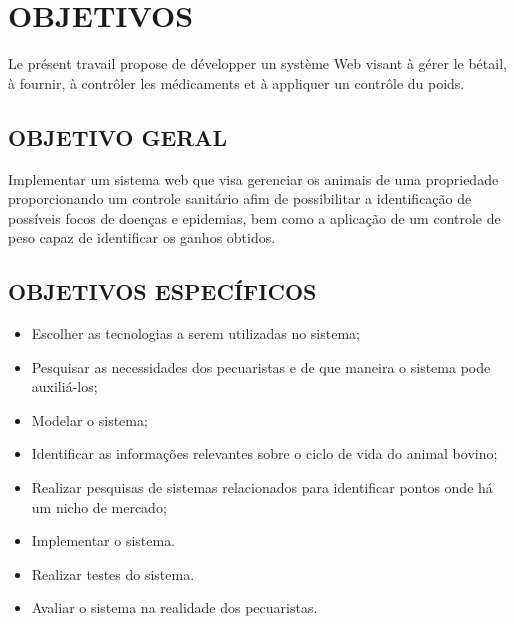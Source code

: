 %
%



\section{OBJETIVOS}

Le présent travail propose de développer un système Web visant à gérer le bétail, à fournir, à contrôler les médicaments et à appliquer un contrôle du poids.

\subsection{OBJETIVO GERAL}

Implementar um sistema web que visa gerenciar os animais de uma propriedade proporcionando um controle sanitário afim de possibilitar a identificação de possíveis focos de doenças e epidemias, bem como a aplicação de um controle de peso capaz de identificar os ganhos obtidos.

\subsection{OBJETIVOS ESPECÍFICOS}

\begin{itemize}
	\item Escolher as tecnologias a serem utilizadas no sistema;
	\item Pesquisar as necessidades dos pecuaristas e de que maneira o sistema pode auxiliá-los;
	\item Modelar o sistema;
	\item Identificar as informações relevantes sobre o ciclo de vida do animal bovino;
	\item Realizar pesquisas de sistemas relacionados para identificar pontos onde há um nicho de mercado;
	\item Implementar o sistema.
	\item Realizar testes do sistema.
	\item Avaliar o sistema na realidade dos pecuaristas.
\end{itemize}
